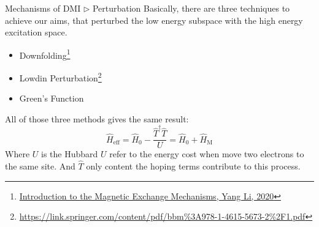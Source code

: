 \documentclass{beamer}
\begin{document}
  \begin{frame}{Mechanisms of DMI \(\rhd\) Perturbation}
    Basically, there are three techniques to achieve our aims, that perturbed the low energy subspace with the high energy excitation space.
    \begin{itemize}
      \item Downfolding\footnote{\tiny\href{https://github.com/kYangLi/PublicPresentation/blob/master/Intro2MEM/Intro._to_MEM.pdf}{Introduction to the Magnetic Exchange Mechanisms, Yang Li, 2020}}
      \item Lowdin Perturbation\footnote{\tiny\url{https://link.springer.com/content/pdf/bbm\%3A978-1-4615-5673-2\%2F1.pdf}}
      \item Green's Function
    \end{itemize}
    \begin{block}{}
      All of those three methods gives the same result:
      \begin{equation}
        \widehat{H}_{\text{eff}} = \widehat{H}_0 - \frac{\widehat{T}^\dagger\widehat{T}}{U} = \widehat{H}_0 + \widehat{H}_{\text{M}}
      \end{equation}
      Where \(U\) is the Hubbard \(U\) refer to the energy cost when move two electrons to the same site. And \(\widehat{T}\) only content the hoping terms contribute to this process.
    \end{block}
  \end{frame}
\end{document}
